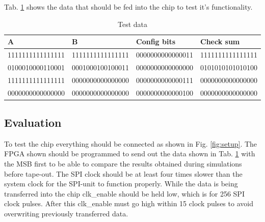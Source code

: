 Tab. \ref{tab:test_data} shows the data that should be fed into the chip to test it's functionality.

\begin{table}[H]
  \caption{Test data}
  \centering
  \begin{tabularx}{\linewidth}{|X|X|X|X|}
    \hline
    \textbf{A} & \textbf{B} & \textbf{Config bits} & \textbf{Check sum} \\ \hline
    1111111111111111 & 1111111111111111 & 0000000000000011 & 1111111111111111\\ \hline
    0100010000110001 & 0001000100100011 & 0000000000000000 & 0101010101010100\\ \hline
    1111111111111111 & 0000000000000000 & 0000000000000111 & 0000000000000000\\ \hline
    0000000000000000 & 0000000000000000 & 0000000000000100 & 0000000000000000\\ \hline
  \end{tabularx}
  \label{tab:test_data}
\end{table}   

\subsection{Evaluation}
To test the chip everything should be connected as shown in Fig. \ref{fig:setup}. The FPGA shown should be programmed to send out the data shown in Tab. \ref{tab:test_data} with the MSB first to be able to compare the results obtained during simulations before tape-out. The SPI clock should be at least four times slower than the system clock for the SPI-unit to function properly. While the data is being transferred into the chip clk\_enable should be held low, which is for 256 SPI clock pulses. After this clk\_enable must go high within 15 clock pulses to avoid overwriting previously transferred data.

